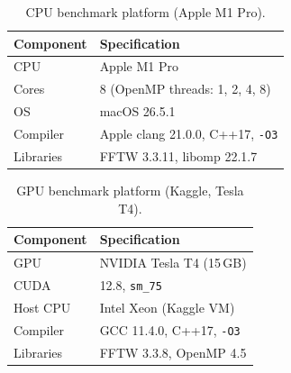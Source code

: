\begin{table}[t]
\centering
\small
\caption{CPU benchmark platform (Apple M1 Pro).}
\label{tab:hardware}
\begin{tabular}{ll}
\toprule
Component & Specification \\
\midrule
CPU & Apple M1 Pro \\
Cores & 8 (OpenMP threads: 1, 2, 4, 8) \\
OS & macOS 26.5.1 \\
Compiler & Apple clang 21.0.0, C++17, \texttt{-O3} \\
Libraries & FFTW 3.3.11, libomp 22.1.7 \\
\bottomrule
\end{tabular}
\end{table}

\begin{table}[t]
\centering
\small
\caption{GPU benchmark platform (Kaggle, Tesla T4).}
\label{tab:gpu_hardware}
\begin{tabular}{ll}
\toprule
Component & Specification \\
\midrule
GPU & NVIDIA Tesla T4 (15\,GB) \\
CUDA & 12.8, \texttt{sm\_75} \\
Host CPU & Intel Xeon (Kaggle VM) \\
Compiler & GCC 11.4.0, C++17, \texttt{-O3} \\
Libraries & FFTW 3.3.8, OpenMP 4.5 \\
\bottomrule
\end{tabular}
\end{table}
